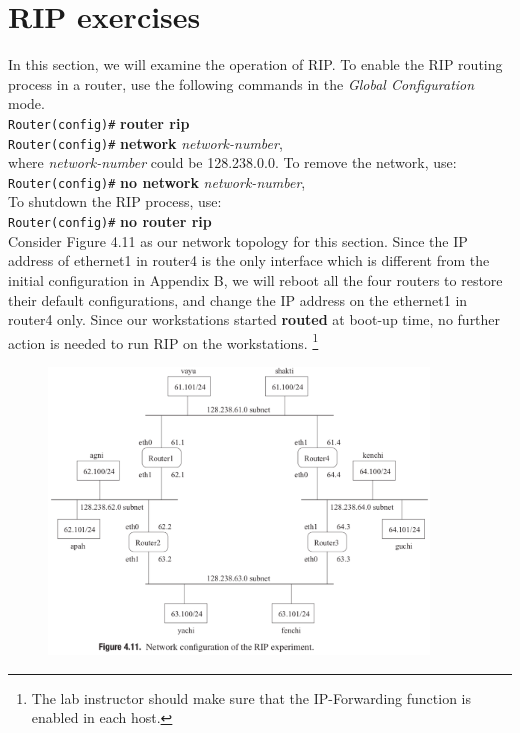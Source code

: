 \documentclass[10pt,a4paper]{article}
\numberwithin{equation}{section}
\numberwithin{figure}{section}
\numberwithin{table}{section}
\begin{document}
    \section*{RIP exercises}
    In this section, we will examine the operation of RIP. To enable the RIP routing process in a router, use the following commands in the \textit{Global Configuration} mode. \\
    \texttt{Router(config)\#} \textbf{router rip} \\
    \texttt{Router(config)\#} \textbf{network} \textit{network-number}, \\
    where \textit{network-number} could be 128.238.0.0. To remove the network, use: \\
    \texttt{Router(config)\#} \textbf{no network} \textit{network-number}, \\
    To shutdown the RIP process, use: \\
    \texttt{Router(config)\#} \textbf{no router rip} \\
    Consider Figure 4.11 as our network topology for this section.
    Since the IP address of ethernet1 in router4 is the only interface which is different from the initial configuration in Appendix B, we will reboot all the four routers to restore their default configurations, and change the IP address on the ethernet1 in router4 only. Since our workstations started \textbf{routed} at boot-up time, no further action is needed to run RIP on the workstations. \footnote{The lab instructor should make sure that the IP-Forwarding function is enabled in each host.}
    \begin{figure}[H]
        \centering
        \includegraphics[width=0.9\textwidth]{img/figure4-11.png}
    \end{figure}
\end{document}
